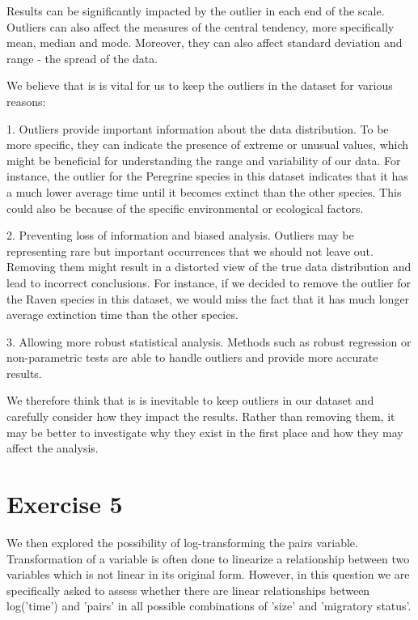 \documentclass{article}
\begin{document}
Results can be significantly impacted by the outlier in each end of the scale. Outliers can also affect the measures of the central tendency, more specifically mean, median and mode. Moreover, they can also affect standard deviation and range - the spread of the data.

We believe that is is vital for us to keep the outliers in the dataset for various reasons:

1. Outliers provide important information about the data distribution. To be more specific, they can indicate the presence of extreme or unusual values, which might be beneficial for understanding the range and variability of our data. For instance,  the outlier for the Peregrine species in this dataset indicates that it has a much lower average time until it becomes extinct than the other species. This could also be because of the specific environmental or ecological factors.

2. Preventing loss of information and biased analysis. Outliers may be representing rare but important occurrences that we should not leave out. Removing them might result in a distorted view of the true data distribution and lead to incorrect conclusions. For instance, if we decided to remove the outlier for the Raven species in this dataset, we would miss the fact that it has much longer average extinction time than the other species.

3. Allowing more robust statistical analysis. Methods such as robust regression or non-parametric tests are able to handle outliers and provide more accurate results.

We therefore think that is is inevitable to keep outliers in our dataset and carefully consider how they impact the results. Rather than removing them, it may be better to investigate why they exist in the first place and how they may affect the analysis.


\section{Exercise 5}
We then explored the possibility of log-transforming the pairs variable. Transformation of a variable is often done to linearize a relationship between two variables which is not linear in its original form. However, in this question we are specifically asked to assess whether there are linear relationships between log('time') and 'pairs' in all possible combinations of 'size' and 'migratory status'.
\end{document}
